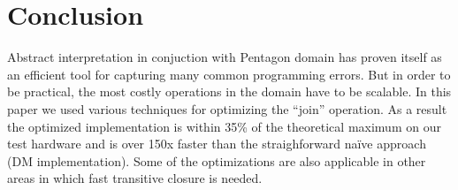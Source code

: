 \documentclass[letterpaper]{article}
\newcommand{\mypar}[1]{{\bf #1.}}
\begin{document}
%
%
%
%
%

\section{Conclusion}
Abstract interpretation in conjuction with Pentagon domain has proven itself as an efficient tool for
capturing many common programming errors. But in order to be practical, the most costly operations in the domain
have to be scalable. In this paper we used various techniques for optimizing the ``join'' operation. As a result the optimized
implementation is within 35\% of the theoretical maximum on our test hardware and is over 150x faster than 
the straighforward na\"ive approach (DM implementation). Some of the optimizations are also applicable in other areas in which
fast transitive closure is needed.
\end{document}

